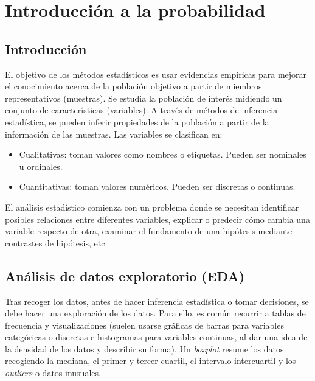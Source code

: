 \chapter{Introducción a la probabilidad}\label{Chapter0} 

\section{Introducción}

El objetivo de los métodos estadísticos es usar evidencias empíricas para mejorar el conocimiento acerca de la población objetivo a partir de miembros representativos (muestras). Se estudia la población de interés midiendo un conjunto de características (variables). A través de métodos de inferencia estadística, se pueden inferir propiedades de la población a partir de la información de las muestras. Las variables se clasifican en:
\begin{itemize}
\item Cualitativas: toman valores como nombres o etiquetas. Pueden ser nominales u ordinales.
\item Cuantitativas: toman valores numéricos. Pueden ser discretas o continuas.
\end{itemize}

El análisis estadístico comienza con un problema donde se necesitan identificar posibles relaciones entre diferentes variables, explicar o predecir cómo cambia una variable respecto de otra, examinar el fundamento de una hipótesis mediante contrastes de hipótesis, etc. \\

\section{Análisis de datos exploratorio (EDA)}

Tras recoger los datos, antes de hacer inferencia estadística o tomar decisiones, se debe hacer una exploración de los datos. Para ello, es común recurrir a tablas de frecuencia y visualizaciones (suelen usarse gráficas de barras para variables categóricas o discretas e histogramas para variables continuas, al dar una idea de la densidad de los datos y describir su forma). Un \textit{boxplot} resume los datos recogiendo la mediana, el primer y tercer cuartil, el intervalo intercuartil y los \textit{outliers} o datos inusuales. \\

